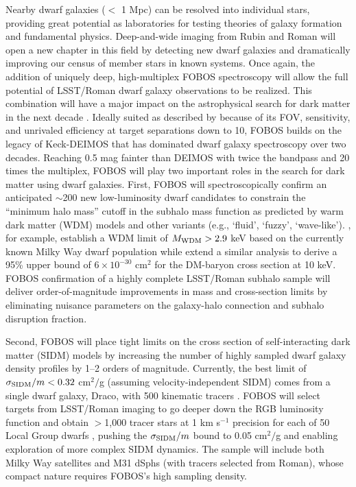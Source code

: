 \documentclass[11pt,a4paper,twoside,onecolumn,openany,final,oldfontcommands]{memoir}
\begin{document}
Nearby dwarf galaxies ($<$ 1 Mpc) can be resolved into individual stars, providing great potential as laboratories for testing theories of galaxy formation and fundamental physics.  Deep-and-wide imaging from Rubin and Roman will open a new chapter in this field by detecting new dwarf galaxies and dramatically improving our census of member stars in known systems.  Once again, the addition of uniquely deep, high-multiplex FOBOS spectroscopy will allow the full potential of LSST/Roman dwarf galaxy observations to be realized.  This combination will have a major impact on the astrophysical search for dark matter in the next decade \citep{drlica-wagner19}.  Ideally suited as described by \citet{simon19} because of its FOV, sensitivity, and unrivaled efficiency at target separations down to 10\arcsec, FOBOS builds on the legacy of Keck-DEIMOS that has dominated dwarf galaxy spectroscopy over two decades.  Reaching 0.5 mag fainter than DEIMOS with twice the bandpass and 20 times the multiplex, FOBOS will play two important roles in the search for dark matter using dwarf galaxies.  First, FOBOS will spectroscopically confirm an anticipated $\sim$200 new low-luminosity dwarf candidates to constrain the ``minimum halo mass'' cutoff in the subhalo mass function as predicted by warm dark matter (WDM) models and other variants (e.g., `fluid', `fuzzy', `wave-like').  \citet{jethwa18}, for example, establish a WDM limit of $M_{\rm WDM} > 2.9$ keV based on the currently known Milky Way dwarf population while \citet{nadler19} extend a similar analysis to derive a 95\% upper bound of $6 \times 10^{-30}$ cm$^2$ for the DM-baryon cross section at 10 keV.  FOBOS confirmation of a highly complete LSST/Roman subhalo sample will deliver order-of-magnitude improvements in mass and cross-section limits by eliminating nuisance parameters on the galaxy-halo connection and subhalo disruption fraction.

Second, FOBOS will place tight limits on the cross section of self-interacting dark matter (SIDM) models by increasing the number of highly sampled dwarf galaxy density profiles by 1--2 orders of magnitude.  Currently, the best limit of $\sigma_{\rm SIDM}/m < 0.32$ cm$^2/$g (assuming velocity-independent SIDM) comes from a single dwarf galaxy, Draco, with 500 kinematic tracers \citep{read18}.  FOBOS will select targets from LSST/Roman imaging to go deeper down the RGB luminosity function and obtain $>$1,000 tracer stars at 1 km s$^{-1}$ precision for each of 50 Local Group dwarfs \citep[see][]{drlica-wagner19}, pushing the $\sigma_{\rm SIDM}/m$ bound to 0.05 cm$^2/$g and enabling exploration of more complex SIDM dynamics.  The sample will include both Milky Way satellites and M31 dSphs (with tracers selected from Roman), whose compact nature requires FOBOS's high sampling density.   
\end{document}
